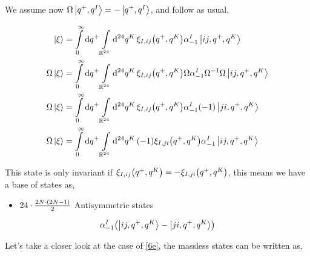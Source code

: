 \probitem{}

We assume now $\Omega\ket{q^+,q^I}=-\ket{q^+,q^I}$, and follow as usual,

\begin{align*}
    \ket{\xi}&=\int\limits_0^\infty\dd{q^+}\int\limits_{\mathbb R^{24}}\dd[24]{q^K}\xi_{I,ij}\qty(q^+,q^K)\alpha^I_{-1}\ket{ij,q^+,q^K}\\
    \Omega\ket{\xi}&=\int\limits_0^\infty\dd{q^+}\int\limits_{\mathbb R^{24}}\dd[24]{q^K}\xi_{I,ij}\qty(q^+,q^K)\Omega\alpha^I_{-1}\Omega^{-1}\Omega\ket{ij,q^+,q^K}\\
    \Omega\ket{\xi}&=\int\limits_0^\infty\dd{q^+}\int\limits_{\mathbb R^{24}}\dd[24]{q^K}\xi_{I,ij}\qty(q^+,q^K)\alpha^I_{-1}\qty(-1)\ket{ji,q^+,q^K}\\
    \Omega\ket{\xi}&=\int\limits_0^\infty\dd{q^+}\int\limits_{\mathbb R^{24}}\dd[24]{q^K}\qty(-1)\xi_{I,ji}\qty(q^+,q^K)\alpha^I_{-1}\ket{ij,q^+,q^K}
\end{align*}

This state is only invariant if $\xi_{I,ij}\qty(q^+,q^K)=-\xi_{I,ji}\qty(q^+,q^K)$, this means we have a base of states as,

\begin{itemize}
    \item $24\cdot\frac{2N\cdot \qty(2N-1)}{2}$ Antisymmetric states
\end{itemize}
\begin{align*}
    \alpha^I_{-1}\qty(\ket{ij,q^+,q^K}-\ket{ji,q^+,q^K})
\end{align*}

\probitem{}

Let's take a closer look at the case of \ref{6e}, the massless states can be written as,

\begin{align*}
    
\end{align*}